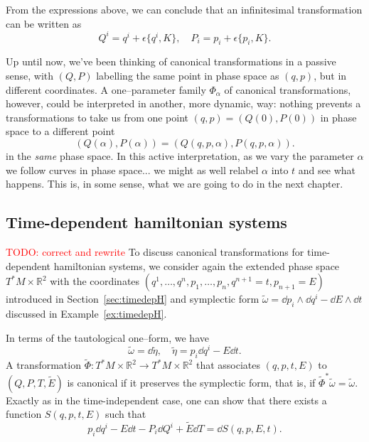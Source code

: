 \documentclass[english,fontsize=11pt,paper=b5]{scrbook}
\numberwithin{equation}{chapter}
\theoremstyle{definition}
\begin{document}
    From the expressions above, we can conclude that an infinitesimal transformation can be written as
    \begin{equation}\label{eq:forminfct}
      Q^i = q^i + \epsilon \big\{q^i, K\big\}, \quad
      P_i = p_i + \epsilon \big\{p_i, K\big\}.
    \end{equation}

    Up until now, we've been thinking of canonical transformations in a passive sense, with $(Q,P)$ labelling the same point in phase space as $(q, p)$, but in different coordinates.
    A one--parameter family $\Phi_\alpha$ of canonical transformations, however, could be interpreted in another, more dynamic, way: nothing prevents a transformations to take us from one point $(q,p)=(Q(0), P(0))$ in phase space to a different point
    \begin{equation}
      (Q(\alpha),P(\alpha)) = (Q(q,p,\alpha), P(q,p,\alpha)).
    \end{equation}
    in the \emph{same} phase space.
    In this active interpretation, as we vary the parameter $\alpha$ we follow curves in phase space... we might as well relabel $\alpha$ into $t$ and see what happens.
    This is, in some sense, what we are going to do in the next chapter.

    \subsection{Time-dependent hamiltonian systems}

    \textcolor{red}{TODO: correct and rewrite}
    To discuss canonical transformations for time-dependent hamiltonian systems, we consider again the extended phase space $T^*M\times \mathbb{R}^2$ with the coordinates $(q^1,\ldots,q^n,p_1,\ldots,p_n, q^{n+1}=t, p_{n+1}=E)$ introduced in Section~\ref{sec:timedepH} and symplectic form  $\widetilde\omega = \dd p_i\wedge \dd q^i - \dd E\wedge \dd t$ discussed in Example~\ref{ex:timedepH}.

    In terms of the tautological one--form, we have
    \begin{equation}
      \widetilde{\omega} = \dd{\widetilde{\eta}}, \quad \widetilde{\eta} = p_i \dd{q^i} - E \dd{t}.
    \end{equation}
    A transformation $\widetilde\Phi : T^*M\times \mathbb{R}^2 \to T^*M\times \mathbb{R}^2$ that associates $(q,p,t,E)$ to $(Q,P,T,\widetilde E)$ is canonical if it preserves the symplectic form, that is, if ${\widetilde\Phi}^* \widetilde \omega = \widetilde \omega$. Exactly as in the time-independent case, one can show that there exists a function $S(q,p,t,E)$ such that
    \begin{equation}\label{eq:timedepgen}
      p_i \dd q^i -E \dd t - P_i \dd Q^i + \widetilde E \dd T = \dd S(q,p,E,t).
    \end{equation}
\end{document}
